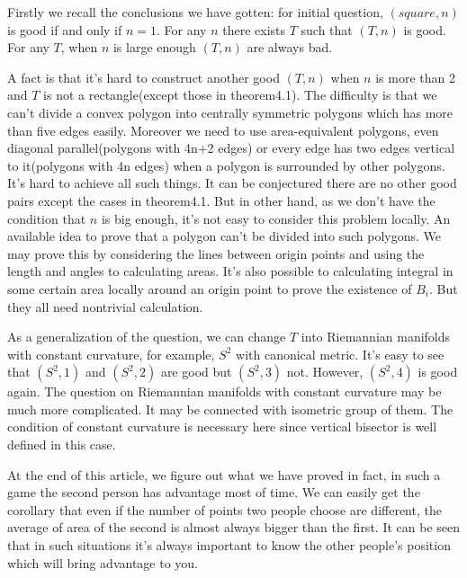 Firstly we recall the conclusions we have gotten: for initial question,
$(square, n)$ is good if and only if $n=1$. For any $n$ there exists 
$T$ such that $(T,n)$ is good. For any $T$, when $n$ is large enough 
$(T,n)$ are always bad.
 	
	
A fact is that it's hard to construct another good $(T, n)$ when $n$ 
is more than 2 and $T$ is not a rectangle(except those in 
theorem4.1). The difficulty is that we can't divide a convex polygon 
into centrally symmetric polygons which has more than five edges easily. 
Moreover we need to use area-equivalent polygons, even 
diagonal parallel(polygons with 4n+2 edges) or every edge has two edges
vertical to it(polygons with 4n edges) when a polygon is surrounded by 
other polygons. It's hard to achieve all such things. It can be conjectured 
there are no other good pairs except the cases in theorem4.1. 
But in other hand, as we don't have the condition that $n$ is big enough, 
it's not easy to consider this problem locally. An available  idea 
to prove that a polygon can't be divided into such polygons. We may prove
this by considering the lines between origin points and using the length 
and angles to calculating areas. It's also possible to calculating 
integral in some certain area locally around an origin point to prove 
the existence of $B_i$. But they all need nontrivial calculation.
	
As a generalization of the question, we can change $T$ into Riemannian 
manifolds with constant curvature, for example, $S^2$ with canonical metric.
It's easy to see that $(S^2, 1)$ and $(S^2, 2)$ are good but $(S^2, 3)$ not.
However, $(S^2,4)$ is good again. The question on Riemannian manifolds 
with constant curvature may be much more complicated. It may be connected 
with isometric group of them.
The condition of constant curvature is necessary here since vertical bisector
is well defined in this case.
	
At the end of this article, we figure out what we have proved in fact, 
in such a game the second person  has advantage most of time. We can 
easily get the corollary that even if the number of points two people 
choose are different, the average of area of the second is almost always 
bigger than the first. It can be seen that in such situations it's always 
important to know the other people's position which will bring advantage 
to you.